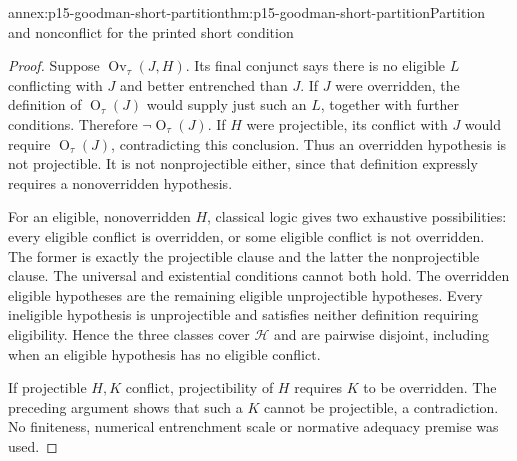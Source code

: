 \begin{annexitem}{annex:p15-goodman-short-partition}{thm:p15-goodman-short-partition}{Partition and nonconflict for the printed short condition}
\begin{proof}
Suppose $\operatorname{Ov}_\tau(J,H)$. Its final conjunct says there
is no eligible $L$ conflicting with $J$ and better entrenched than $J$.
If $J$ were overridden, the definition of $\operatorname{O}_\tau(J)$
would supply just such an $L$, together with further conditions.
Therefore $\neg\operatorname{O}_\tau(J)$. If $H$ were projectible,
its conflict with $J$ would require $\operatorname{O}_\tau(J)$,
contradicting this conclusion. Thus an overridden hypothesis is not
projectible. It is not nonprojectible either, since that definition
expressly requires a nonoverridden hypothesis.

For an eligible, nonoverridden $H$, classical logic gives two exhaustive
possibilities: every eligible conflict is overridden, or some eligible
conflict is not overridden. The former is exactly the projectible clause
and the latter the nonprojectible clause. The universal and existential
conditions cannot both hold. The overridden eligible hypotheses are the
remaining eligible unprojectible hypotheses. Every ineligible hypothesis
is unprojectible and satisfies neither definition requiring eligibility.
Hence the three classes cover $\mathcal H$ and are pairwise disjoint,
including when an eligible hypothesis has no eligible conflict.

If projectible $H,K$ conflict, projectibility of $H$ requires $K$ to be
overridden. The preceding argument shows that such a $K$ cannot be
projectible, a contradiction. No finiteness, numerical entrenchment scale
or normative adequacy premise was used.
\end{proof}
\end{annexitem}


